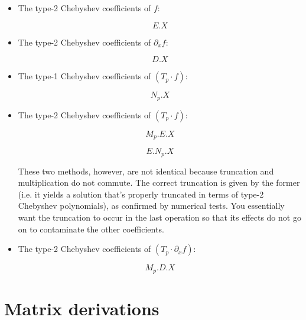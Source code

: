 \documentclass{article}
\begin{document}
\begin{itemize}
    \item The type-2 Chebyshev coefficients of $f$:
    
    \begin{equation*}
    E.X
    \end{equation*}
    
    \item The type-2 Chebyshev coefficients of $\partial_x f$:
    
    \begin{equation*}
    D.X
    \end{equation*}
    
    \item The type-1 Chebyshev coefficients of $(T_p \cdot f)$:
    
    \begin{equation*}
    N_p.X
    \end{equation*}
    
    \item The type-2 Chebyshev coefficients of $(T_p \cdot f)$:

    \begin{equation*}
    M_p.E.X
    \end{equation*}
    
    \begin{equation*}
     E.N_p.X
    \end{equation*}

    These two methods, however, are not identical because truncation and multiplication do not commute.  The correct truncation is given by the former (i.e. it yields a solution that's properly truncated in terms of type-2 Chebyshev polynomials), as confirmed by numerical tests.  You essentially want the truncation to occur in the last operation so that its effects do not go on to contaminate the other coefficients.
    
    \item The type-2 Chebyshev coefficients of $(T_p \cdot \partial_x f)$:
    
    \begin{equation*}
    M_p.D.X
    \end{equation*}
\end{itemize}

\section{Matrix derivations}
\end{document}
